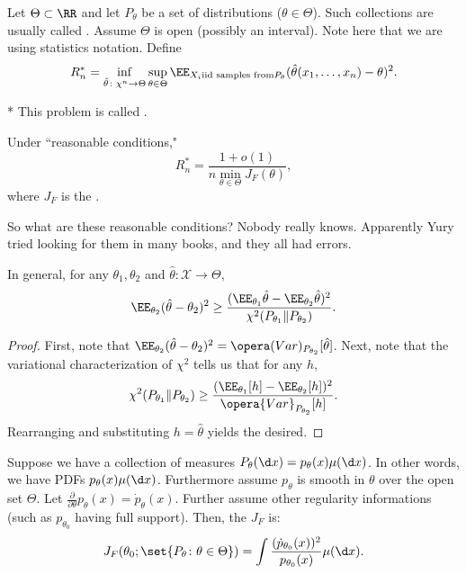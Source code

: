 Let $\Theta \subset \RR$ and let $P_\theta$ be a set of distributions ($\theta\in \Theta$). Such collections are usually called .
Assume $\Theta$ is open (possibly an interval). Note here that we are using statistics notation.
Define \[
	R_n^* = \inf_{\hat\theta \colon \chi^n \to \Theta} \sup_{\theta \in \Theta} \EE_{X_i \text{iid samples from} P_\theta} (\hat\theta(x_1, \ldots, x_n) - \theta)^2.
\]
\begin{fact}*
	This problem is called .
\end{fact}

\begin{thm}
	Under ``reasonable conditions," \[
		R_n^* = \frac{1+o(1)}{n \min_{\theta\in \Theta} J_F(\theta)},
	\]
	where $J_F$ is the .
\end{thm}

So what are these reasonable conditions? Nobody really knows. Apparently Yury tried looking for them in many books, and they all had errors.

\begin{lem}
	In general, for any $\theta_1, \theta_2$ and $\hat\theta \colon \mathcal X\to \Theta$, \[
		\EE_{\theta_2} (\hat\theta - \theta_2)^2 \geq \frac{(\EE_{\theta_1} \hat \theta - \EE_{\theta_2} \hat \theta)^2}{\chi^2(P_{\theta_1}\Vert P_{\theta_2})}.
	\]
\end{lem}

\begin{proof}
	First, note that $\EE_{\theta_2} (\hat \theta - \theta_2)^2 = \opera(Var)_{P_{\theta_2}} [\hat \theta]$. Next, note that the variational characterization of $\chi^2$ tells us that for any $h$, \[
		\chi^2(P_{\theta_1}\Vert P_{\theta_2}) \geq \frac{(\EE_{\theta_1}[h] - \EE_{\theta_2}[h])^2}{\opera{Var}_{P_{\theta_2}}[h]}.
	\]
	Rearranging and substituting $h =\hat \theta$ yields the desired.
\end{proof}

\begin{defn}
	Suppose we have a collection of measures $P_\theta(\d x) = p_\theta(x) \mu(\d x)$. In other words, we have PDFs $p_\theta(x) \mu(\d x)$.
	Furthermore assume $p_\theta$ is smooth in $\theta$ over the open set $\Theta$.
	Let $\frac{\partial}{\partial \theta} p_\theta(x) = \dot p_\theta(x)$.
	Further assume other regularity informations (such as $p_{\theta_0}$ having full support).
	Then, the  $J_F$ is: \[
		J_F(\theta_0; \set{P_\theta \colon \theta\in \Theta}) = \int \frac{(\dot p_{\theta_0} (x))^2}{p_{\theta_0}(x)} \mu (\d x).
	\]
\end{defn}

